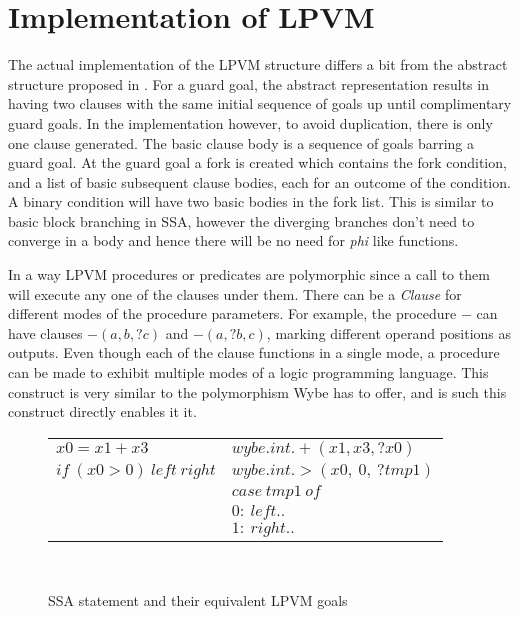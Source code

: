 \chapter{Implementation of LPVM}
\label{chap:lpvm}

The actual implementation of the LPVM structure differs a bit from the abstract
structure proposed in \cite{lpvm2015}. For a guard goal, the abstract
representation results in having two clauses with the same initial sequence of
goals up until complimentary guard goals. In the implementation however, to
avoid duplication, there is only one clause generated. The basic clause body is
a sequence of goals barring a guard goal. At the guard goal a fork is created
which contains the fork condition, and a list of basic subsequent clause
bodies, each for an outcome of the condition. A binary condition will have two
basic bodies in the fork list. This is similar to basic block branching in SSA,
however the diverging branches don't need to converge in a body and hence there
will be no need for \textit{phi} like functions.

In a way LPVM procedures or predicates are polymorphic since a call to them
will execute any one of the clauses under them. There can be a \textit{Clause}
for different modes of the procedure parameters. For example, the procedure
\( - \) can have clauses \( -(a, b, ?c) \) and \( -(a, ?b, c) \), marking
different operand positions as outputs. Even though each of the clause
functions in a single mode, a procedure can be made to exhibit multiple modes
of a logic programming language. This construct is very similar to the
polymorphism Wybe has to offer, and is such this construct directly enables it
it. 


\begin{figure}
  \centering
  \begin{tabular}{l@{\hskip 1in} l}
    \( x0 = x1 + x3 \)              & \( wybe.int.+(x1, x3, ?x0) \) \\
    \( if\ (x0 > 0)\ left\ right \) & \( wybe.int.>(x0,\ 0,\ ?tmp1) \) \\
                                    & \( case\ tmp1\ of \) \\
                                    & \( 0:\ left.. \) \\
                                    & \( 1:\ right.. \) \\
    

  \end{tabular}
  \\
  \caption{SSA statement and their equivalent LPVM goals}
\end{figure}

